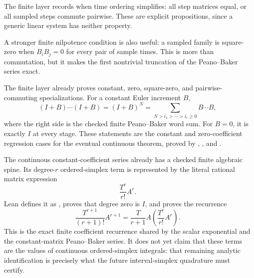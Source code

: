 \begin{definition}
\label{def:constant-commuting-samples}
\leanok
The finite layer records when time ordering simplifies: all step matrices
equal, or all sampled steps commute pairwise. These are explicit propositions,
since a generic linear system has neither property.

A stronger finite nilpotence condition is also useful: a sampled family is
square-zero when \(B_iB_j=0\) for every pair of sample times. This is more
than commutation, but it makes the first nontrivial truncation of the
Peano--Baker series exact.
\end{definition}

\begin{theorem}
\label{thm:peano-baker-specializations}
\leanok
The finite layer already proves constant, zero, square-zero, and
pairwise-commuting specializations. For a constant Euler increment \(B\),
\[
 (I+B)\cdots(I+B)=(I+B)^N
   =\sum_{N>i_1>\cdots>i_r\ge0}B\cdots B,
\]
where the right side is the checked finite Peano--Baker word sum. For
\(B=0\), it is exactly \(I\) at every stage. These statements are the
constant and zero-coefficient regression cases for the eventual continuous
theorem, proved by ,
, and
.

The continuous constant-coefficient series already has a checked finite
algebraic spine.  Its degree-\(r\) ordered-simplex term is represented by
the literal rational matrix expression
\[
  \frac{T^r}{r!}A^r.
\]
Lean defines it as , proves that degree
zero is \(I\), and proves the recurrence
\[
  \frac{T^{r+1}}{(r+1)!}A^{r+1}
  =\frac{T}{r+1}A\left(\frac{T^r}{r!}A^r\right).
\]
This is the exact finite coefficient recurrence shared by the scalar
exponential and the constant-matrix Peano--Baker series.  It does not yet
claim that these terms are the values of continuous ordered-simplex
integrals: that remaining analytic identification is precisely what the
future interval-simplex quadrature must certify.


\end{theorem}
